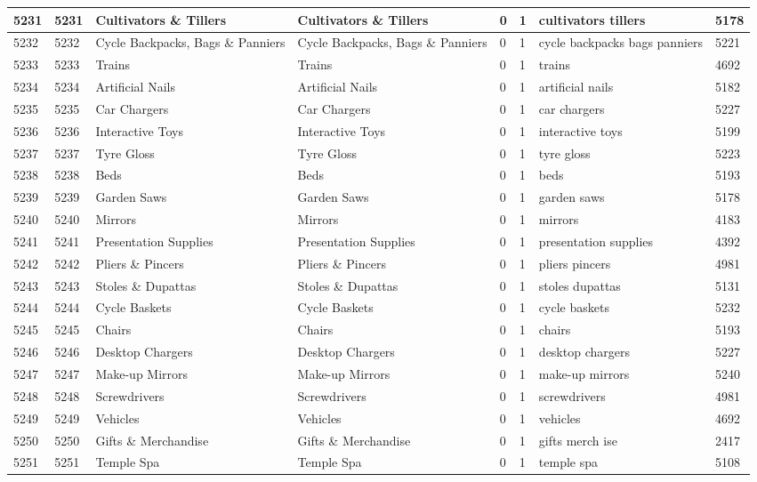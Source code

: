 \begin{longtable}{|l|l|l|l|l|l|l|l|}
5231 & 5231 & Cultivators \& Tillers & Cultivators \& Tillers & 0 & 1 & cultivators tillers & 5178 \\ \hline 
5232 & 5232 & Cycle Backpacks, Bags \& Panniers & Cycle Backpacks, Bags \& Panniers & 0 & 1 & cycle backpacks bags panniers & 5221 \\ \hline 
5233 & 5233 & Trains & Trains & 0 & 1 & trains & 4692 \\ \hline 
5234 & 5234 & Artificial Nails & Artificial Nails & 0 & 1 & artificial nails & 5182 \\ \hline 
5235 & 5235 & Car Chargers & Car Chargers & 0 & 1 & car chargers & 5227 \\ \hline 
5236 & 5236 & Interactive Toys & Interactive Toys & 0 & 1 & interactive toys & 5199 \\ \hline 
5237 & 5237 & Tyre Gloss & Tyre Gloss & 0 & 1 & tyre gloss & 5223 \\ \hline 
5238 & 5238 & Beds & Beds & 0 & 1 & beds & 5193 \\ \hline 
5239 & 5239 & Garden Saws & Garden Saws & 0 & 1 & garden saws & 5178 \\ \hline 
5240 & 5240 & Mirrors & Mirrors & 0 & 1 & mirrors & 4183 \\ \hline 
5241 & 5241 & Presentation Supplies & Presentation Supplies & 0 & 1 & presentation supplies & 4392 \\ \hline 
5242 & 5242 & Pliers \& Pincers & Pliers \& Pincers & 0 & 1 & pliers pincers & 4981 \\ \hline 
5243 & 5243 & Stoles \& Dupattas & Stoles \& Dupattas & 0 & 1 & stoles dupattas & 5131 \\ \hline 
5244 & 5244 & Cycle Baskets & Cycle Baskets & 0 & 1 & cycle baskets & 5232 \\ \hline 
5245 & 5245 & Chairs & Chairs & 0 & 1 & chairs & 5193 \\ \hline 
5246 & 5246 & Desktop Chargers & Desktop Chargers & 0 & 1 & desktop chargers & 5227 \\ \hline 
5247 & 5247 & Make-up Mirrors & Make-up Mirrors & 0 & 1 & make-up mirrors & 5240 \\ \hline 
5248 & 5248 & Screwdrivers & Screwdrivers & 0 & 1 & screwdrivers & 4981 \\ \hline 
5249 & 5249 & Vehicles & Vehicles & 0 & 1 & vehicles & 4692 \\ \hline 
5250 & 5250 & Gifts \& Merchandise & Gifts \& Merchandise & 0 & 1 & gifts merch ise & 2417 \\ \hline 
5251 & 5251 & Temple Spa & Temple Spa & 0 & 1 & temple spa & 5108 \\ \hline 

\end{longtable}

